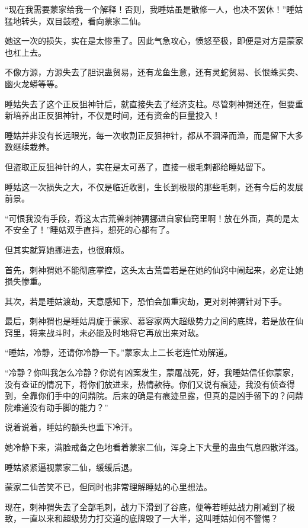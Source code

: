 
\begin{this_body}



“现在我需要蒙家给我一个解释！否则，我睡姑虽是散修一人，也决不罢休！”睡姑猛地转头，双目鼓瞪，看向蒙家二仙。

她这一次的损失，实在是太惨重了。因此气急攻心，愤怒至极，即便是对方是蒙家也杠上去。

不像方源，方源失去了胆识蛊贸易，还有龙鱼生意，还有灵蛇贸易、长恨蛛买卖、幽火龙蟒等等。

睡姑失去了这个正反狙神针后，就直接失去了经济支柱。尽管刺神猬还在，但要重新培养出正反狙神针，不仅是时间，还有资金的巨量投入！

睡姑并非没有长远眼光，每一次收割正反狙神针，都从不涸泽而渔，而是留下大多数继续栽养。

但盗取正反狙神针的人，实在是太可恶了，直接一根毛刺都给睡姑留下。

睡姑这一次损失之大，不仅是临近收割，生长到极限的那些毛刺，还有今后的发展前景。

“可恨我没有手段，将这太古荒兽刺神猬挪进自家仙窍里啊！放在外面，真的是太不安全了！”睡姑双手直抖，想死的心都有了。

但其实就算她挪进去，也很麻烦。

首先，刺神猬她不能彻底掌控，这头太古荒兽若是在她的仙窍中闹起来，必定让她损失惨重。

其次，若是睡姑渡劫，天意感知下，恐怕会加重灾劫，更对刺神猬针对下手。

最后，刺神猬也是睡姑周旋于蒙家、慕容家两大超级势力之间的底牌，若是放在仙窍里，将来战斗时，未必能及时地将它再放出来对敌。

“睡姑，冷静，还请你冷静一下。”蒙家太上二长老连忙劝解道。

“冷静？你叫我怎么冷静？你说有凶案发生，蒙屠战死，好，我睡姑信任你蒙家，没有查证的情况下，将你们放进来，热情款待。你们又说有痕迹，我没有侦查得到，全靠你们手中的问鼎院。后来的确是有痕迹显露，但真的是凶手留下的？问鼎院难道没有动手脚的能力？”

说着说着，睡姑的额头也垂下冷汗。

她冷静下来，满脸戒备之色地看着蒙家二仙，浑身上下大量的蛊虫气息四散洋溢。

睡姑紧紧逼视蒙家二仙，缓缓后退。

蒙家二仙苦笑不已，但同时也非常理解睡姑的心里想法。

现在，刺神猬失去了全部毛刺，战力下滑到了谷底，便等若睡姑战力削减到了极致，一直以来和超级势力打交道的底牌毁了一大半，这叫睡姑如何不警惕？


\end{this_body}
